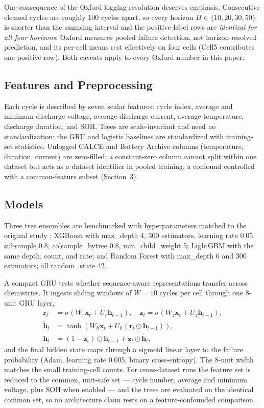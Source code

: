 \documentclass[11pt,a4paper]{article}
\begin{document}
One consequence of the Oxford logging resolution deserves emphasis. Consecutive cleaned cycles are roughly 100 cycles apart, so every horizon $H\in\{10,20,30,50\}$ is shorter than the sampling interval and the positive-label rows are \emph{identical for all four horizons}: Oxford measures pooled failure detection, not horizon-resolved prediction, and its per-cell means rest effectively on four cells (Cell5 contributes one positive row). Both caveats apply to every Oxford number in this paper.

\subsection{Features and Preprocessing}
Each cycle is described by seven scalar features: cycle index, average and minimum discharge voltage, average discharge current, average temperature, discharge duration, and SOH. Trees are scale-invariant and need no standardization; the GRU and logistic baselines are standardized with training-set statistics. Unlogged CALCE and Battery Archive columns (temperature, duration, current) are zero-filled; a constant-zero column cannot split within one dataset but acts as a dataset identifier in pooled training, a confound controlled with a common-feature subset (Section~3).

\subsection{Models}
Three tree ensembles are benchmarked with hyperparameters matched to the original study \cite{shikdar2026learning}: XGBoost \cite{chen2016xgboost} with max\_depth 4, 300 estimators, learning rate 0.05, subsample 0.8, colsample\_bytree 0.8, min\_child\_weight 5; LightGBM \cite{ke2017lightgbm} with the same depth, count, and rate; and Random Forest \cite{breiman2001random} with max\_depth 6 and 300 estimators; all random\_state 42.

A compact GRU \cite{cho2014learning} tests whether sequence-aware representations transfer across chemistries. It ingests sliding windows of $W{=}10$ cycles per cell through one 8-unit GRU layer,
\begin{equation}\label{eq:gru}
\begin{aligned}
\mathbf{r}_t &= \sigma(W_r\mathbf{x}_t + U_r\mathbf{h}_{t-1}),\quad
\mathbf{z}_t = \sigma(W_z\mathbf{x}_t + U_z\mathbf{h}_{t-1}),\\
\tilde{\mathbf{h}}_t &= \tanh(W_h\mathbf{x}_t + U_h(\mathbf{r}_t\odot\mathbf{h}_{t-1})),\\
\mathbf{h}_t &= (1-\mathbf{z}_t)\odot\mathbf{h}_{t-1} + \mathbf{z}_t\odot\tilde{\mathbf{h}}_t,
\end{aligned}
\end{equation}
and the final hidden state maps through a sigmoid linear layer to the failure probability (Adam, learning rate 0.005, binary cross-entropy). The 8-unit width matches the small training-cell counts. For cross-dataset runs the feature set is reduced to the common, unit-safe set --- cycle number, average and minimum voltage, plus SOH when enabled --- and the trees are evaluated on the identical common set, so no architecture claim rests on a feature-confounded comparison.
\end{document}
